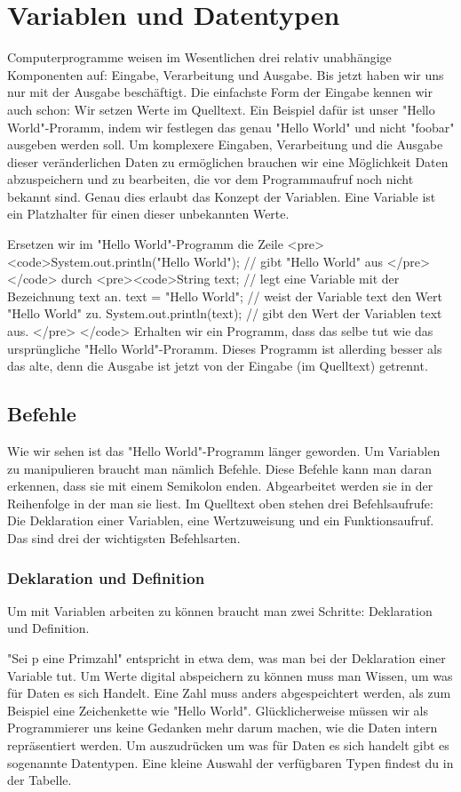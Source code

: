 \chapter{Variablen und Datentypen}
Computerprogramme weisen im Wesentlichen drei relativ unabhängige Komponenten auf: Eingabe, Verarbeitung und Ausgabe. Bis jetzt haben wir uns nur mit der Ausgabe beschäftigt.
Die einfachste Form der Eingabe kennen wir auch schon: Wir setzen Werte im Quelltext. Ein Beispiel dafür ist unser "Hello World"-Proramm, indem wir festlegen das genau "Hello World" und nicht "foobar" ausgeben werden soll.
Um komplexere Eingaben, Verarbeitung und die Ausgabe dieser veränderlichen Daten zu ermöglichen brauchen wir eine Möglichkeit Daten abzuspeichern und zu bearbeiten, die vor dem Programmaufruf noch nicht bekannt sind.
Genau dies erlaubt das Konzept der Variablen. Eine Variable ist ein Platzhalter für einen dieser unbekannten Werte.

Ersetzen wir im "Hello World"-Programm die Zeile
<pre><code>System.out.println("Hello World"); // gibt "Hello World" aus </pre> </code>
durch
<pre><code>String text; // legt eine Variable mit der Bezeichnung text an.
text = "Hello World"; // weist der Variable text den Wert "Hello World" zu.
System.out.println(text); // gibt den Wert der Variablen text aus. </pre> </code>
Erhalten wir ein Programm, dass das selbe tut wie das ursprüngliche "Hello World"-Proramm.
Dieses Programm ist allerding besser als das alte, denn die Ausgabe ist jetzt von der Eingabe (im Quelltext) getrennt.

\section {Befehle}
Wie wir sehen ist das "Hello World"-Programm länger geworden. Um Variablen zu manipulieren braucht man nämlich Befehle. Diese Befehle kann man daran erkennen, dass sie mit einem Semikolon enden. Abgearbeitet werden sie in der Reihenfolge in der man sie liest. Im Quelltext oben stehen drei Befehlsaufrufe:
Die Deklaration einer Variablen, eine Wertzuweisung und ein Funktionsaufruf. Das sind drei der wichtigsten Befehlsarten.

\subsection {Deklaration und Definition}
Um mit Variablen arbeiten zu können braucht man zwei Schritte: Deklaration und Definition.

"Sei p eine Primzahl" entspricht in etwa dem, was man bei der Deklaration einer Variable tut. Um Werte digital abspeichern zu können muss man Wissen, um was für Daten es sich Handelt. Eine Zahl muss anders abgespeichtert werden, als zum Beispiel eine Zeichenkette wie "Hello World".
Glücklicherweise müssen wir als Programmierer uns keine Gedanken mehr darum machen, wie die Daten intern repräsentiert werden.
Um auszudrücken um was für Daten es sich handelt gibt es sogenannte Datentypen. Eine kleine Auswahl der verfügbaren Typen findest du in der Tabelle.

